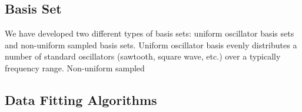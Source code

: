\documentclass[twoside,a4paper]{article}
\begin{document}
\subsection{Basis Set}
\label{ssec:basisset}
We have developed two different types of basis sets: uniform oscillator basis sets and non-uniform sampled basis sets. 
Uniform oscillator basis evenly distributes a number of standard oscillators (sawtooth, square wave, etc.) over a typically frequency range. 
Non-uniform sampled 

\subsection{Data Fitting Algorithms}
\label{ssec:datafittingalgorithm}


\nocite{*}

\end{document}
